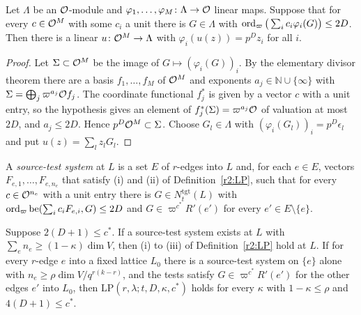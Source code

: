 \begin{lemma}\label{r2:smith}
Let $\Lambda$ be an $\mathcal O$-module and $\varphi_1,\dots,\varphi_M\colon\Lambda\to\mathcal O$ linear maps. Suppose that for every $c\in\mathcal O^M$ with some $c_i$ a unit there is $G\in\Lambda$ with $\operatorname{ord}_\varpi\big(\sum_ic_i\varphi_i(G)\big)\le 2D$. Then there is a linear $u\colon\mathcal O^M\to\Lambda$ with $\varphi_i(u(z))=p^Dz_i$ for all $i$.
\end{lemma}

\begin{proof}
Let $\Sigma\subset\mathcal O^M$ be the image of $G\mapsto(\varphi_i(G))_i$. By the elementary divisor theorem there are a basis $f_1,\dots,f_M$ of $\mathcal O^M$ and exponents $a_j\in\mathbb N\cup\{\infty\}$ with $\Sigma=\bigoplus_j\varpi^{a_j}\mathcal O f_j$. The coordinate functional $f_j^*$ is given by a vector $c$ with a unit entry, so the hypothesis gives an element of $f_j^*(\Sigma)=\varpi^{a_j}\mathcal O$ of valuation at most $2D$, and $a_j\le2D$. Hence $p^D\mathcal O^M\subset\Sigma$. Choose $G_l\in\Lambda$ with $(\varphi_i(G_l))_i=p^D\epsilon_l$ and put $u(z)=\sum_lz_lG_l$.
\end{proof}

A \emph{source-test system} at $L$ is a set $E$ of $r$-edges into $L$ and, for each $e\in E$, vectors $F_{e,1},\dots,F_{e,n_e}$ that satisfy (i) and (ii) of Definition~\ref{r2:LP}, such that for every $c\in\mathcal O^{n_e}$ with a unit entry there is $G\in N^{\mathrm{tgt}}_t(L)$ with $\operatorname{ord}_\varpi\mathrm{be}(\sum_ic_iF_{e,i},G)\le2D$ and $G\in\varpi^{c^*}R'(e')$ for every $e'\in E\setminus\{e\}$.

\begin{proposition}\label{r2:assembly}
Suppose $2(D+1)\le c^*$. If a source-test system exists at $L$ with $\sum_en_e\ge(1-\kappa)\dim V$, then (i) to (iii) of Definition~\ref{r2:LP} hold at $L$. If for every $r$-edge $e$ into a fixed lattice $L_0$ there is a source-test system on $\{e\}$ alone with $n_e\ge\rho\dim V/q^{r(k-r)}$, and the tests satisfy $G\in\varpi^{c^*}R'(e')$ for the other edges $e'$ into $L_0$, then $\mathrm{LP}(r,\lambda;t,D,\kappa,c^*)$ holds for every $\kappa$ with $1-\kappa\le\rho$ and $4(D+1)\le c^*$.
\end{proposition}


